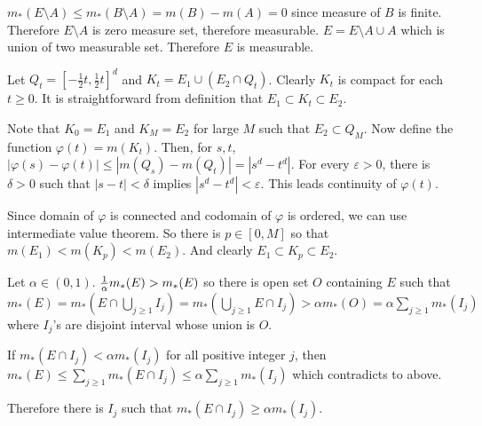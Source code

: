 \begin{problem}[1.26] \hfill

	$m_*(E \setminus A) \leq m_*(B \setminus A) = m(B) - m(A) = 0$ since measure of $B$ is finite. Therefore $E\setminus A$ is zero measure set, therefore measurable. $E = E \setminus A \cup A$ which is union of two measurable set. Therefore $E$ is measurable.
	
\end{problem}

\begin{problem}[1.27] \hfill

	Let $Q_t = [-\frac{1}{2}t, \frac{1}{2}t]^d$ and $K_t = E_1 \cup \left( E_2 \cap Q_t \right)$. Clearly $K_t$ is compact for each $t \geq 0$. It is straightforward from definition that $E_1 \subset K_t \subset E_2$.

	Note that $K_0 = E_1$ and $K_M = E_2$ for large $M$ such that $E_2 \subset Q_M$. Now define the function $\varphi(t) = m(K_t)$. Then, for $s, t$, $\left | \varphi(s) - \varphi(t) \right | \leq \left | m(Q_s) - m(Q_t) \right | = |s^d - t^d|$.
	For every $\varepsilon>0$, there is $\delta>0$ such that $|s-t| < \delta$ implies $|s^d - t^d| < \varepsilon$. This leads continuity of $\varphi(t)$.

	Since domain of $\varphi$ is connected and codomain of $\varphi$ is ordered, we can use intermediate value theorem. So there is $p \in [0, M]$ so that $m(E_1) < m(K_p) < m(E_2)$. And clearly $E_1 \subset K_p \subset E_2$.
	
\end{problem}

\begin{problem}[1.28] \hfill

	Let $\alpha \in \left( 0, 1 \right)$. ${1 \over \alpha} m_*(E) > m_*(E)$ so there is open set $O$ containing $E$ such that $m_*(E) = m_*(E \cap \bigcup_{j \geq 1} I_j ) = m_*(\bigcup_{j\geq 1}E\cap I_j) > \alpha m_*(O) = \alpha \sum_{j \geq 1} m_*(I_j)$ where $I_j$'s are disjoint interval whose union is $O$.

	If $m_*(E\cap I_j) < \alpha m_*(I_j)$ for all positive integer $j$, then $m_*(E) \leq \sum_{j\geq 1} m_*(E\cap I_j) \leq \alpha \sum_{j\geq 1}m_*(I_j)$ which contradicts to above. 

	Therefore there is $I_j$ such that $m_*(E \cap I_j) \geq \alpha m_*(I_j)$.
	
\end{problem}


